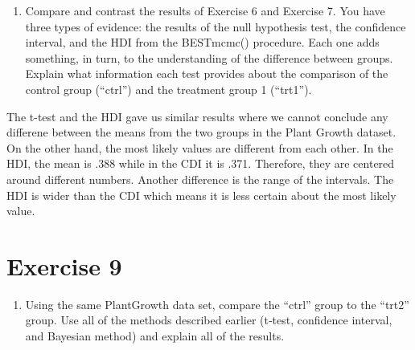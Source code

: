 \documentclass[
]{article}
\newenvironment{Shaded}{\begin{snugshade}}{\end{snugshade}}
\newcommand{\FunctionTok}[1]{\textcolor[rgb]{0.00,0.00,0.00}{#1}}
\newcommand{\NormalTok}[1]{#1}
\newcommand{\SpecialCharTok}[1]{\textcolor[rgb]{0.00,0.00,0.00}{#1}}
\newcommand{\StringTok}[1]{\textcolor[rgb]{0.31,0.60,0.02}{#1}}
\providecommand{\tightlist}{%
  \setlength{\itemsep}{0pt}\setlength{\parskip}{0pt}}
\begin{document}
\begin{enumerate}
\def\labelenumi{\arabic{enumi}.}
\setcounter{enumi}{7}
\tightlist
\item
  Compare and contrast the results of Exercise 6 and Exercise 7. You
  have three types of evidence: the results of the null hypothesis test,
  the confidence interval, and the HDI from the BESTmcmc() procedure.
  Each one adds something, in turn, to the understanding of the
  difference between groups. Explain what information each test provides
  about the comparison of the control group (``ctrl'') and the treatment
  group 1 (``trt1'').
\end{enumerate}

The t-test and the HDI gave us similar results where we cannot conclude
any differene between the means from the two groups in the Plant Growth
dataset. On the other hand, the most likely values are different from
each other. In the HDI, the mean is .388 while in the CDI it is .371.
Therefore, they are centered around different numbers. Another
difference is the range of the intervals. The HDI is wider than the CDI
which means it is less certain about the most likely value.

\hypertarget{exercise-9}{%
\section{Exercise 9}\label{exercise-9}}

\begin{enumerate}
\def\labelenumi{\arabic{enumi}.}
\setcounter{enumi}{8}
\tightlist
\item
  Using the same PlantGrowth data set, compare the ``ctrl'' group to the
  ``trt2'' group. Use all of the methods described earlier (t‐test,
  confidence interval, and Bayesian method) and explain all of the
  results.
\end{enumerate}

\begin{Shaded}
\end{Shaded}
\end{document}
